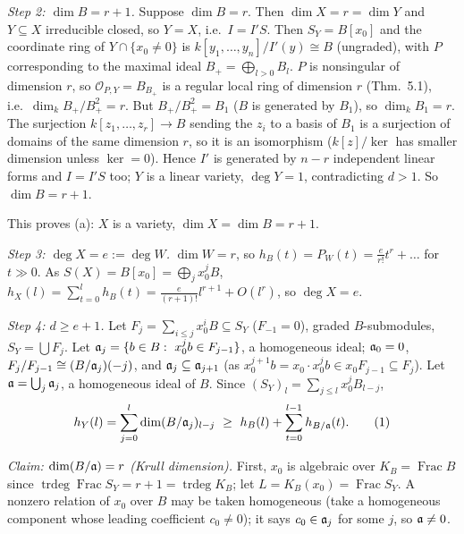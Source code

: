 \documentclass[11pt]{article}
\begin{document}
\emph{Step 2: $\dim B=r+1$.} Suppose $\dim B=r$. Then $\dim X=r=\dim Y$ and $Y\subseteq X$ irreducible closed, so $Y=X$, i.e.\ $I=I'S$. Then $S_Y=B[x_0]$ and the coordinate ring of $Y\cap\{x_0\ne0\}$ is $k[y_1,\dots,y_n]/I'(y)\cong B$ (ungraded), with $P$ corresponding to the maximal ideal $B_+=\bigoplus_{l>0}B_l$. $P$ is nonsingular of dimension $r$, so $\mathcal O_{P,Y}=B_{B_+}$ is a regular local ring of dimension $r$ (Thm.~5.1), i.e.\ $\dim_k B_+/B_+^2=r$. But $B_+/B_+^2=B_1$ ($B$ is generated by $B_1$), so $\dim_kB_1=r$. The surjection $k[z_1,\dots,z_r]\to B$ sending the $z_i$ to a basis of $B_1$ is a surjection of domains of the same dimension $r$, so it is an isomorphism ($k[z]/\ker$ has smaller dimension unless $\ker=0$). Hence $I'$ is generated by $n-r$ independent linear forms and $I=I'S$ too; $Y$ is a linear variety, $\deg Y=1$, contradicting $d>1$. So $\dim B=r+1$.

This proves (a): $X$ is a variety, $\dim X=\dim B=r+1$.

\emph{Step 3: $\deg X=e:=\deg W$.} $\dim W=r$, so $h_B(t)=P_W(t)=\frac e{r!}t^r+\dots$ for $t\gg0$. As $S(X)=B[x_0]=\bigoplus_jx_0^jB$, $h_X(l)=\sum_{t=0}^lh_B(t)=\frac e{(r+1)!}l^{r+1}+O(l^r)$, so $\deg X=e$.

\emph{Step 4: $d\ge e+1$.} Let $F_j=\sum_{i\le j}x_0^iB\subseteq S_Y$ ($F_{-1}=0$), graded $B$-submodules, $S_Y=\bigcup F_j$. Let $\mathfrak a_j=\{b\in B:\ x_0^jb\in F_{j-1}\}$, a homogeneous ideal; $\mathfrak a_0=0$, $F_j/F_{j-1}\cong(B/\mathfrak a_j)(-j)$, and $\mathfrak a_j\subseteq\mathfrak a_{j+1}$ (as $x_0^{j+1}b=x_0\cdot x_0^jb\in x_0F_{j-1}\subseteq F_j$). Let $\mathfrak a=\bigcup_j\mathfrak a_j$, a homogeneous ideal of $B$. Since $(S_Y)_l=\sum_{j\le l}x_0^jB_{l-j}$,
\[
h_Y(l)=\sum_{j=0}^l\dim(B/\fa_j)_{l-j}\ \ge\ h_B(l)+\sum_{t=0}^{l-1}h_{B/\fa}(t).\tag{1}
\]

\emph{Claim: $\dim(B/\mathfrak a)=r$ (Krull dimension).} First, $x_0$ is algebraic over $K_B=\operatorname{Frac}B$ since $\operatorname{trdeg}\operatorname{Frac}S_Y=r+1=\operatorname{trdeg}K_B$; let $L=K_B(x_0)=\operatorname{Frac}S_Y$. A nonzero relation of $x_0$ over $B$ may be taken homogeneous (take a homogeneous component whose leading coefficient $c_0\ne0$); it says $c_0\in\mathfrak a_j$ for some $j$, so $\mathfrak a\ne0$.
\end{document}
